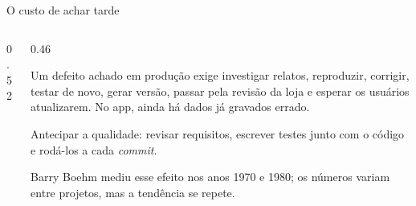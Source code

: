 \begin{frame}{O custo de achar tarde}
  \begin{columns}[c]
    \begin{column}{0.52\textwidth}
      \centering
    \end{column}
    \begin{column}{0.46\textwidth}
      \begin{conceito}
        Um defeito achado em produção exige investigar relatos, reproduzir, corrigir, testar de novo, gerar versão, passar pela revisão da loja e esperar os usuários atualizarem. No app, ainda há dados já gravados errado.
      \end{conceito}
      \begin{dica}
        Antecipar a qualidade: revisar requisitos, escrever testes junto com o código e rodá-los a cada \emph{commit}.
      \end{dica}
      \begin{historia}
        Barry Boehm mediu esse efeito nos anos 1970 e 1980; os números variam entre projetos, mas a tendência se repete.
      \end{historia}
    \end{column}
  \end{columns}
\end{frame}

